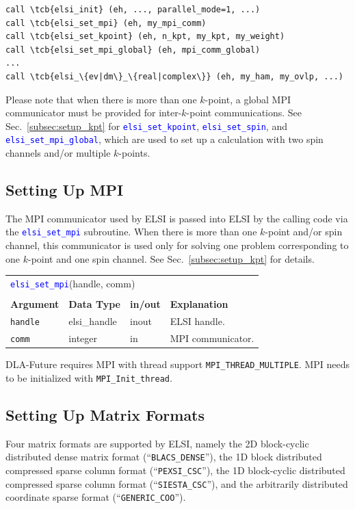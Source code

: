 \documentclass{report}
\newcommand{\tcb}[1]{\textcolor{blue}{#1}}
\newcommand{\api}[1]{\textcolor{blue}{\texttt{#1}}}
\begin{document}
\begin{tcolorbox}
\begin{Verbatim}[commandchars=\\\{\}]
call \tcb{elsi_init} (eh, ..., parallel_mode=1, ...)
call \tcb{elsi_set_mpi} (eh, my_mpi_comm)
call \tcb{elsi_set_kpoint} (eh, n_kpt, my_kpt, my_weight)
call \tcb{elsi_set_mpi_global} (eh, mpi_comm_global)
...
call \tcb{elsi_\{ev|dm\}_\{real|complex\}} (eh, my_ham, my_ovlp, ...)
\end{Verbatim}
\end{tcolorbox}

Please note that when there is more than one $k$-point, a global MPI communicator must be provided for inter-$k$-point communications. See Sec.~\ref{subsec:setup_kpt} for \api{elsi\_set\_kpoint}, \api{elsi\_set\_spin}, and \api{elsi\_set\_mpi\_global}, which are used to set up a calculation with two spin channels and/or multiple $k$-points.

\subsection{Setting Up MPI}
\label{subsec:setup_mpi}
The MPI communicator used by ELSI is passed into ELSI by the calling code via the \api{elsi\_set\_mpi} subroutine. When there is more than one $k$-point and/or spin channel, this communicator is used only for solving one problem corresponding to one $k$-point and one spin channel. See Sec.~\ref{subsec:setup_kpt} for details.

\begin{tabular}[]{|p{20mm}|p{20mm}|p{10mm}|p{112mm}|}
\multicolumn{4}{l}{\api{elsi\_set\_mpi}(handle, comm)}\\
\multicolumn{4}{l}{}\\
\hline
\multicolumn{1}{|l|}{\textbf{Argument}} & \multicolumn{1}{l|}{\textbf{Data Type}} & \multicolumn{1}{l|}{\textbf{in/out}} & \multicolumn{1}{l|}{\textbf{Explanation}}\\
\hline
\texttt{handle} & elsi\_handle & inout & ELSI handle.\\
\hline
\texttt{comm}   & integer      & in    & MPI communicator.\\
\hline
\end{tabular}

DLA-Future requires MPI with thread support \texttt{MPI\_THREAD\_MULTIPLE}. MPI needs to be initialized with \texttt{MPI\_Init\_thread}.

\subsection{Setting Up Matrix Formats}
\label{subsec:setup_matrix}
Four matrix formats are supported by ELSI, namely the 2D block-cyclic distributed dense matrix format (``\texttt{BLACS\_DENSE}''), the 1D block distributed compressed sparse column format (``\texttt{PEXSI\_CSC}''), the 1D block-cyclic distributed compressed sparse column format (``\texttt{SIESTA\_CSC}''), and the arbitrarily distributed coordinate sparse format (``\texttt{GENERIC\_COO}'').
\end{document}
